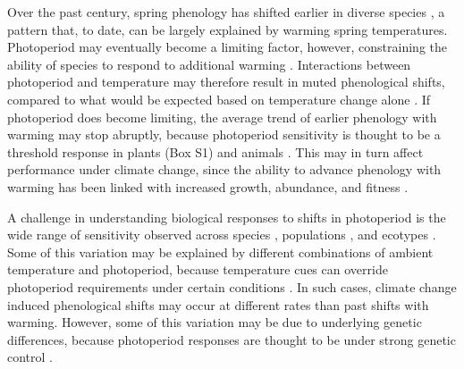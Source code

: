 \documentclass{article}
\begin{document}
\par Over the past century, spring phenology has shifted earlier in diverse species \citep{menzel2000,ovaskainen2013,penuelas2002,polgar2013}, a pattern that, to date, can be largely explained by warming spring temperatures. Photoperiod may eventually become a limiting factor, however, constraining the ability of species to respond to additional warming \citep{koerner2010b,vitasse2013, Morin:2010aa,Nienstaedt:1966aa}. Interactions between photoperiod and temperature may therefore result in muted phenological shifts, compared to what would be expected based on temperature change alone \citep{wareing1956,mimura2007,koerner2010b}. If photoperiod does become limiting, the average trend of earlier phenology with warming may stop abruptly, because photoperiod sensitivity is thought to be a threshold response in plants (Box S1) and animals \citep{tobin2008}. This may in turn affect performance under climate change, since the ability to advance phenology with warming has been linked with increased growth, abundance, and fitness \citep{muir1994,cleland2012,willis2010}.%


\par A challenge in understanding biological responses to shifts in photoperiod is the wide range of sensitivity observed across species \citep{Sanz-Perez:2009aa, zohner2016,flynn2018}, populations \citep{tanino2010}, and ecotypes \citep{Howe:1995aa}. Some of this variation may be explained by different combinations of ambient temperature and photoperiod, because temperature cues can override photoperiod requirements under certain conditions \citep [e.g.,][] {tanino2010}. In such cases, climate change induced phenological shifts may occur at different rates than past shifts with warming. However, some of this variation may be due to underlying genetic differences, because photoperiod responses are thought to be under strong genetic control \citep{bradshaw1995,weih2004,keller2011}. 
\end{document}
